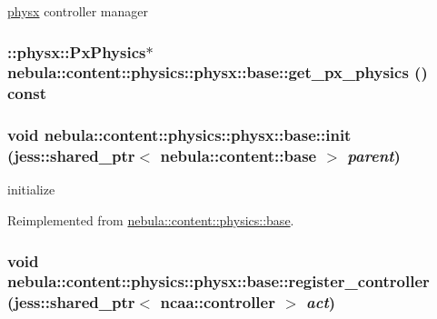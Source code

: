 \hyperlink{namespacenebula_1_1content_1_1physics_1_1physx}{physx} controller manager \hypertarget{classnebula_1_1content_1_1physics_1_1physx_1_1base_a64f40aec9f4c33d419cc767a0ba331dd}{
\subsubsection[{get\_\-px\_\-physics}]{\setlength{\rightskip}{0pt plus 5cm}::physx::PxPhysics$\ast$ nebula::content::physics::physx::base::get\_\-px\_\-physics () const}}
\label{classnebula_1_1content_1_1physics_1_1physx_1_1base_a64f40aec9f4c33d419cc767a0ba331dd}
\hypertarget{classnebula_1_1content_1_1physics_1_1physx_1_1base_a18c8861b65e5812832ed38e5347a892f}{
\subsubsection[{init}]{\setlength{\rightskip}{0pt plus 5cm}void nebula::content::physics::physx::base::init (jess::shared\_\-ptr$<$ {\bf nebula::content::base} $>$ {\em parent})}}
\label{classnebula_1_1content_1_1physics_1_1physx_1_1base_a18c8861b65e5812832ed38e5347a892f}


initialize 

Reimplemented from \hyperlink{classnebula_1_1content_1_1physics_1_1base_a439dac137dc1e30ea980fe02fc20390b}{nebula::content::physics::base}.\hypertarget{classnebula_1_1content_1_1physics_1_1physx_1_1base_a6c4dcfefecc75adb38939f189592ba56}{
\subsubsection[{register\_\-controller}]{\setlength{\rightskip}{0pt plus 5cm}void nebula::content::physics::physx::base::register\_\-controller (jess::shared\_\-ptr$<$ {\bf ncaa::controller} $>$ {\em act})}}
\label{classnebula_1_1content_1_1physics_1_1physx_1_1base_a6c4dcfefecc75adb38939f189592ba56}


